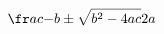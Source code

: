 \documentclass[preview]{standalone}
\begin{document}
\begin{align*}
\fr a c { - b   \pm   \sqrt{   b ^ 2   -   4 a c   }}{ 2 a }
\end{align*}
\end{document}
